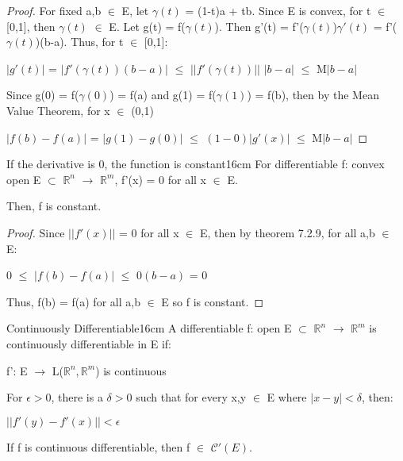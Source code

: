     \begin{proof}
        For fixed a,b $\in$ E, let $\gamma(t)$ = (1-t)a + tb.
        Since E is convex, for t $\in$ [0,1], then $\gamma(t)$ $\in$ E.
        Let g(t) = f($\gamma(t)$).
        Then g'(t) = f'($\gamma(t)$)$\gamma'(t)$
        = f'($\gamma(t)$)(b-a). Thus, for t $\in$ [0,1]:

        \hspace{0.5cm}
        $|g'(t)|$
        = $|f'(\gamma(t))(b-a)|$
        $\leq$ $||f'(\gamma(t))||$ $|b-a|$
        $\leq$ M$|b-a|$

        Since g(0) = f($\gamma(0)$) = f(a)
        and g(1) = f($\gamma(1)$) = f(b), then by the Mean Value Theorem,
        for x $\in$ (0,1)

        \hspace{0.5cm}
        $|f(b) - f(a)|$
        = $|g(1) - g(0)|$
        $\leq$ $(1-0) |g'(x)|$
        $\leq$ M$|b-a|$
    \end{proof}

    \vspace{0.5cm}



    \begin{corollary}{If the derivative is 0, the function is constant}{16cm}
        For differentiable f: convex open E $\subset$ $\mathbb{R}^n$
        $\rightarrow$ $\mathbb{R}^m$, f'(x) = 0 for all x $\in$ E.
        
        Then, f is constant.
    \end{corollary}

    \begin{proof}
        Since $||f'(x)||$ = 0 for all x $\in$ E,
        then by {\color{red} theorem 7.2.9}, for all a,b $\in$ E:
        
        \hspace{0.5cm}
        0 $\leq$ $|f(b) - f(a)|$ $\leq$ $0(b-a)$ = 0

        Thus, f(b) = f(a) for all a,b $\in$ E so f is constant.
    \end{proof}

    \vspace{0.5cm}



    \begin{definition}{Continuously Differentiable}{16cm}
        A differentiable f: open E $\subset$ $\mathbb{R}^n$
        $\rightarrow$ $\mathbb{R}^m$ is {\color{lblue} continuously differentiable}
        in E if:
        
        \hspace{0.5cm}
        f': E $\rightarrow$ L($\mathbb{R}^n,\mathbb{R}^m$) is continuous

        For $\epsilon > 0$, there is a $\delta > 0$ such that for
        every x,y $\in$ E where $|x-y| < \delta$, then:

        \hspace{0.5cm}
        $||f'(y) - f'(x)|| < \epsilon$

        If f is continuous differentiable, then f $\in$ $\mathscr{C}'(E)$.
    \end{definition}

